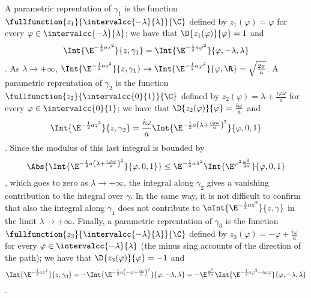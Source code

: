 %
A parametric reprentation of $\gamma_{1}$ is the function $\fullfunction{z_{1}}{\intervalcc{-\lambda}
   {\lambda}}{\C}$ defined by
$z_{1}(\varphi) = \varphi$ for every
$\varphi\in\intervalcc{-\lambda}{\lambda}$; we have that $\D{z_{1}(\varphi)}{\varphi} =
1$ and
\begin{dmath*}[compact]%
   \Int{\E^{-\frac{1}{2}az^{2}}}{z, \gamma_{1}} =
   \Int{\E^{-\frac{1}{2}a\varphi^{2}}}{\varphi, -\lambda, \lambda}
\end{dmath*}.
As $\lambda\rightarrow+\infty$, $\Int{\E^{-\frac{1}{2}a z^{2}}}{z, \gamma_{1}}
\rightarrow \Int{\E^{-\frac{1}{2} a\varphi^{2}}}{\varphi, \R} =
\sqrt{\frac{2\pi}{a}}$.
%
A parametric reprentation of $\gamma_{2}$ is the function $\fullfunction{z_{2}}{\intervalcc{0}
   {1}}{\C}$ defined by
$z_{2}(\varphi) = \lambda + \frac{i\varphi\omega}{a} $ for every
$\varphi\in\intervalcc{0}{1}$; we have that $\D{z_{2}(\varphi)}{\varphi} =
\frac{i\omega}{a}$ and
\begin{dmath*}[compact]%
   \Int{\E^{-\frac{1}{2}az^{2}}}{z, \gamma_{2}} =
\frac{i\omega}{a} \Int{\E^{-\frac{1}{2}a\left( \lambda  + \frac{i\varphi \omega}{a}
	 \right)^{2}}}{\varphi ,0,1}
\end{dmath*}.
Since the modulus of this last integral is bounded by 
\begin{dmath*}[compact]
   \Abs{ 
\Int{\E^{-\frac{1}{2}a\left( \lambda  + \frac{i\varphi \omega}{a}
	 \right)^{2}}}{\varphi ,0,1}
} \leq   \E^{-\frac{1}{2} a \lambda^{2}} \Int{ \E^{ \varphi^{2}
      \frac{\omega^{2} }{2a}}}{\varphi, 0, 1}
\end{dmath*},
which goes to zero 
as $\lambda\rightarrow+\infty$, the integral along
$\gamma_{2}$ gives a vanishing contribution to the integral over $\gamma$.
In the same way, it is not difficult to confirm that also the integral along
$\gamma_{4}$ does not contribute to $\oInt{\E^{-\frac{1}{2}az^2}}{z,\gamma}$ in the limit $\lambda\rightarrow+\infty$.
%
Finally, a parametric reprentation of $\gamma_{3}$ is the function $\fullfunction{z_{3}}{\intervalcc{-\lambda}
   {\lambda}}{\C}$ defined by
$z_{3}(\varphi) = -\varphi + \frac{i\omega}{a}$ for every
$\varphi\in\intervalcc{-\lambda}{\lambda}$ (the minus sing accounts of the
direction of the path); we have that $\D{z_{3}(\varphi)}{\varphi} =-1
$ and
\begin{dmath*}[compact]%
   \Int{\E^{-\frac{1}{2}az^{2}}}{z, \gamma_{3}} =
   -\Int{\E^{-\frac{1}{2}a\left( -\varphi+ \frac{i\omega}{a}
	 \right)^{2}}}{\varphi, -\lambda, \lambda}=
   -\E^{\frac{\omega^{2}}{2a}}
   \Int{\E^{-\frac{1}{2}a\varphi^{2} - i\omega \varphi }
	 }{\varphi, -\lambda, \lambda} 
\end{dmath*}.
